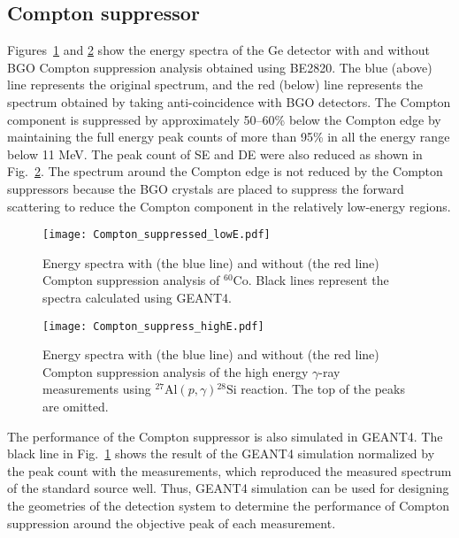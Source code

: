 \subsection{Compton suppressor}\label{sec:compton}

Figures~\ref{fig:Compton_suppressed_lowE} and \ref{fig:Compton_suppressed_highE} show the energy spectra of the Ge detector with and without BGO Compton suppression analysis obtained using BE2820.
The blue (above) line represents the original spectrum, and the red (below) line represents the spectrum obtained by taking anti-coincidence with BGO detectors.
The Compton component is suppressed by approximately 50--60\% below the Compton edge 
by maintaining the full energy peak counts of more than 95\% in all the energy range below 11 MeV. 
The peak count of SE and DE were also reduced as shown in Fig.~\ref{fig:Compton_suppressed_highE}. 
The spectrum around the Compton edge is not reduced by the Compton suppressors 
because the BGO crystals are placed to suppress the forward scattering to reduce the Compton component in the relatively low-energy regions.


\begin{figure}
  \centering
  \texttt{[image: Compton\_suppressed\_lowE.pdf]}
  \caption{Energy spectra with (the blue line) and without (the red line) Compton suppression analysis of $^{60}$Co. Black lines represent the spectra calculated using GEANT4.}
  \label{fig:Compton_suppressed_lowE}
\end{figure}
\begin{figure}
  \centering
  \texttt{[image: Compton\_suppress\_highE.pdf]}
  \caption{Energy spectra with (the blue line) and without (the red line) Compton suppression analysis of the high energy $\gamma$-ray measurements using $^{27}\mathrm{Al}(p,\gamma){}^{28}\mathrm{Si}$ reaction. 
  The top of the peaks are omitted.}
  \label{fig:Compton_suppressed_highE}
\end{figure}

The performance of the Compton suppressor is also simulated in GEANT4.
The black line in Fig.~\ref{fig:Compton_suppressed_lowE} shows the result of the GEANT4 simulation 
normalized by the peak count with the measurements, which reproduced the measured spectrum 
of the standard source well.
Thus, GEANT4 simulation can be used for designing the geometries of the detection system 
to determine the performance of Compton suppression around the objective peak of each measurement.
